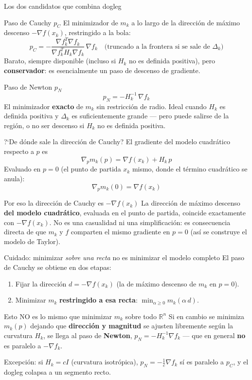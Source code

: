 \documentclass[aspectratio=169]{beamer}
\newcommand{\grad}{\nabla}
\begin{document}
\begin{frame}{Los dos candidatos que combina dogleg}
  \small
  \begin{block}{Paso de Cauchy $p_C$}
    El minimizador de $m_k$ a lo largo de la direcci\'on de m\'aximo descenso $-\grad f(x_k)$, restringido a la bola:
    \[ p_C = -\frac{\grad f_k^T \grad f_k}{\grad f_k^T H_k \grad f_k}\, \grad f_k \quad \text{(truncado a la frontera si se sale de } \Delta_k) \]
    Barato, siempre disponible (incluso si $H_k$ no es definida positiva), pero \textbf{conservador}: es esencialmente un paso de descenso de gradiente.
  \end{block}
  \begin{block}{Paso de Newton $p_N$}
    \[ p_N = -H_k^{-1}\, \grad f_k \]
    El minimizador \textbf{exacto} de $m_k$ sin restricci\'on de radio. Ideal cuando $H_k$ es definida positiva y $\Delta_k$ es suficientemente grande --- pero puede salirse de la regi\'on, o no ser descenso si $H_k$ no es definida positiva.
  \end{block}
\end{frame}

\begin{frame}{?`De d\'onde sale la direcci\'on de Cauchy?}
  El gradiente del modelo cuadr\'atico respecto a $p$ es
  \[ \grad_p m_k(p) = \grad f(x_k) + H_k\, p \]
  Evaluado en $p=0$ (el punto de partida $x_k$ mismo, donde el t\'ermino cuadr\'atico se anula):
  \[ \grad_p m_k(0) = \grad f(x_k) \]
  \begin{alertblock}{Por eso la direcci\'on de Cauchy es $-\grad f(x_k)$}
    La direcci\'on de m\'aximo descenso \textbf{del modelo cuadr\'atico}, evaluada en el punto de partida, coincide exactamente con $-\grad f(x_k)$. No es una casualidad ni una simplificaci\'on: es consecuencia directa de que $m_k$ y $f$ comparten el mismo gradiente en $p=0$ (as\'i se construye el modelo de Taylor).
  \end{alertblock}
\end{frame}

\begin{frame}{Cuidado: minimizar \emph{sobre una recta} no es minimizar el modelo completo}
  El paso de Cauchy se obtiene en dos etapas:
  \begin{enumerate}
    \item Fijar la direcci\'on $d=-\grad f(x_k)$ (la de m\'aximo descenso de $m_k$ en $p=0$).
    \item Minimizar $m_k$ \textbf{restringido a esa recta}: $\displaystyle\min_{\alpha\geq0} m_k(\alpha\, d)$.
  \end{enumerate}
  \begin{alertblock}{Esto NO es lo mismo que minimizar $m_k$ sobre todo $\mathbb{R}^n$}
    Si en cambio se minimiza $m_k(p)$ dejando que \textbf{direcci\'on y magnitud} se ajusten libremente seg\'un la curvatura $H_k$, se llega al paso de \textbf{Newton}, $p_N=-H_k^{-1}\grad f_k$ --- que en general \textbf{no} es paralelo a $-\grad f_k$.
  \end{alertblock}
  \centering
  \small
  Excepci\'on: si $H_k=cI$ (curvatura isotr\'opica), $p_N=-\tfrac1c\grad f_k$ s\'i es paralelo a $p_C$, y el dogleg colapsa a un segmento recto.
\end{frame}
\end{document}
